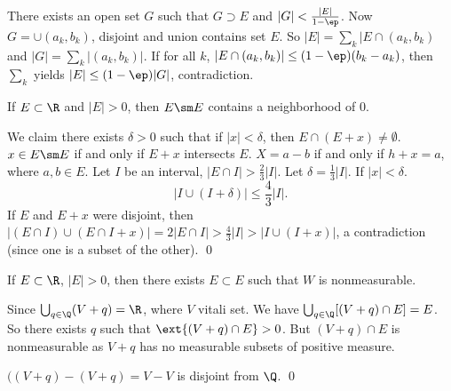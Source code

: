 \pf There exists an open set $G$ such that $G \supset E$ and $|G|< \frac{|E|}{1-\ep}$. Now $G= \cup (a_k,b_k)$, disjoint and union contains set $E$. So $|E|= \sum_k |E \cap (a_k,b_k)$ and $|G|= \sum_k |(a_k,b_k)|$. If for all $k$, $| E \cap (a_k,b_k)| \leq (1- \ep)(b_k-a_k)$, then $\sum_k$ yields $|E| \leq (1-\ep)|G|$, contradiction. 



\begin{lem} \label{lem:subzero}
If $E \subset \R$ and $|E|>0$, then $E \sm E$ contains a neighborhood of 0. 
\end{lem}



\pf We claim there exists $\delta>0$ such that if $|x|<\delta$, then $E \cap (E+x) \neq \emptyset$. $x \in E \sm E$ if and only if $E+x$ intersects $E$. $X= a-b$ if and only if $h+x=a$, where $a,b \in E$. Let $I$ be an interval, $|E \cap I|> \frac{2}{3} |I|$. Let $\delta= \frac{1}{3} |I|$. If $|x|<\delta$.
	\[
	|I \cup (I+\delta)| \leq \frac{4}{3} |I|. 
	\]
If $E$ and $E+x$ were disjoint, then $| (E \cap I) \cup (E \cap I +x)|= 2|E \cap I|> \frac{4}{3} |I|> |I \cup (I+x)|$, a contradiction (since one is a subset of the other). \qed \\



\begin{thm}
If $E \subset \R$, $|E|>0$, then there exists $E \subset E$ such that $W$ is nonmeasurable. 
\end{thm}

\pf Since $\bigcup_{q \in \Q} (V+q)=\R$, where $V$ vitali set. We have $\bigcup_{q \in \Q} [(V+q) \cap E]=E$. So there exists $q$ such that $\ext{(V+q) \cap E} >0$. But $(V+q) \cap E$ is nonmeasurable as $V+q$ has no measurable subsets of positive measure. 

$((V+q)-(V+q)= V-V$ is disjoint from $\Q$. \qed \\
































